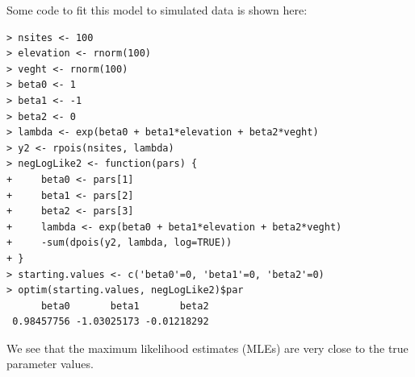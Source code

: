 Some code to fit this model to simulated data is shown here:
\begin{verbatim}
> nsites <- 100
> elevation <- rnorm(100)
> veght <- rnorm(100)
> beta0 <- 1
> beta1 <- -1
> beta2 <- 0
> lambda <- exp(beta0 + beta1*elevation + beta2*veght)
> y2 <- rpois(nsites, lambda)
> negLogLike2 <- function(pars) {
+     beta0 <- pars[1]
+     beta1 <- pars[2]
+     beta2 <- pars[3]
+     lambda <- exp(beta0 + beta1*elevation + beta2*veght)
+     -sum(dpois(y2, lambda, log=TRUE))
+ }
> starting.values <- c('beta0'=0, 'beta1'=0, 'beta2'=0)
> optim(starting.values, negLogLike2)$par
      beta0       beta1       beta2
 0.98457756 -1.03025173 -0.01218292
\end{verbatim}
We see that the maximum likelihood estimates (MLEs) are very close to
the true parameter values.

